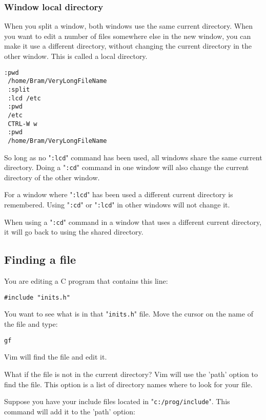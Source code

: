 \subsubsection{Window local directory}
When you split a window, both windows use the same current directory.
When you want to edit a number of files somewhere else in the new window, you can make it use a different directory, without changing the current directory in the other window.
This is called a local directory.

\begin{Verbatim}[samepage=true]
 :pwd
 /home/Bram/VeryLongFileName
 :split
 :lcd /etc
 :pwd
 /etc
 CTRL-W w
 :pwd
 /home/Bram/VeryLongFileName
\end{Verbatim}

So long as no "\verb!:lcd!" command has been used, all windows share the same current directory.
Doing a "\verb!:cd!" command in one window will also change the current directory of the other window.

For a window where "\verb!:lcd!" has been used a different current directory is remembered.
Using "\verb!:cd!" or "\verb!:lcd!" in other windows will not change it.

When using a "\verb!:cd!" command in a window that uses a different current directory, it will go back to using the shared directory.
\subsection{Finding a file}
You are editing a C program that contains this line:

\begin{Verbatim}[samepage=true]
    #include "inits.h" 
\end{Verbatim}

You want to see what is in that "\verb!inits.h!" file.
Move the cursor on the name of the file and type:

\begin{Verbatim}[samepage=true]
 gf
\end{Verbatim}

Vim will find the file and edit it.

What if the file is not in the current directory?  Vim will use the 'path' option to find the file.
This option is a list of directory names where to look for your file.

Suppose you have your include files located in "\verb!c:/prog/include!".
This command will add it to the 'path' option:

